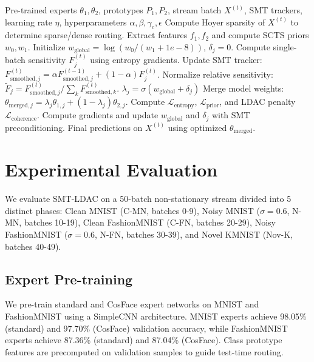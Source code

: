 \documentclass{article}
\theoremstyle{plain}
\theoremstyle{definition}
\theoremstyle{remark}
\begin{document}
\begin{algorithm}[tb]
\caption{SMT-LDAC Test-Time Model Merging}
\label{alg:smt_ldac}
\begin{algorithmic}[1]
 Pre-trained experts $\theta_1, \theta_2$, prototypes $P_1, P_2$, stream batch $X^{(t)}$, SMT trackers, learning rate $\eta$, hyperparameters $\alpha, \beta, \gamma_c, \epsilon$
\STATE Compute Hoyer sparsity of $X^{(t)}$ to determine sparse/dense routing.
\STATE Extract features $f_1, f_2$ and compute SCTS priors $w_0, w_1$.
\STATE Initialize $w_{\text{global}} = \log(w_0 / (w_1 + 1e-8))$, $\delta_j = 0$.
\STATE Compute single-batch sensitivity $F_j^{(t)}$ using entropy gradients.
\STATE Update SMT tracker: $F_{\text{smoothed}, j}^{(t)} = \alpha F_{\text{smoothed}, j}^{(t-1)} + (1-\alpha) F_j^{(t)}$.
\STATE Normalize relative sensitivity: $\tilde{F}_j = F_{\text{smoothed}, j}^{(t)} / \sum_k F_{\text{smoothed}, k}^{(t)}$.
\STATE $\lambda_j = \sigma(w_{\text{global}} + \delta_j)$
\STATE Merge model weights: $\theta_{\text{merged}, j} = \lambda_j \theta_{1, j} + (1 - \lambda_j) \theta_{2, j}$.
\STATE Compute $\mathcal{L}_{\text{entropy}}$, $\mathcal{L}_{\text{prior}}$, and LDAC penalty $\mathcal{L}_{\text{coherence}}$.
\STATE Compute gradients and update $w_{\text{global}}$ and $\delta_j$ with SMT preconditioning.
\ENDFOR
{} Final predictions on $X^{(t)}$ using optimized $\theta_{\text{merged}}$.
\end{algorithmic}
\end{algorithm}

\section{Experimental Evaluation}
\label{sec:experiments}
We evaluate SMT-LDAC on a 50-batch non-stationary stream divided into 5 distinct phases: Clean MNIST (C-MN, batches 0-9), Noisy MNIST ($\sigma = 0.6$, N-MN, batches 10-19), Clean FashionMNIST (C-FN, batches 20-29), Noisy FashionMNIST ($\sigma = 0.6$, N-FN, batches 30-39), and Novel KMNIST (Nov-K, batches 40-49).

\subsection{Expert Pre-training}
\label{sec:pretraining}
We pre-train standard and CosFace expert networks on MNIST and FashionMNIST using a SimpleCNN architecture. MNIST experts achieve 98.05\% (standard) and 97.70\% (CosFace) validation accuracy, while FashionMNIST experts achieve 87.36\% (standard) and 87.04\% (CosFace). Class prototype features are precomputed on validation samples to guide test-time routing.
\end{document}
